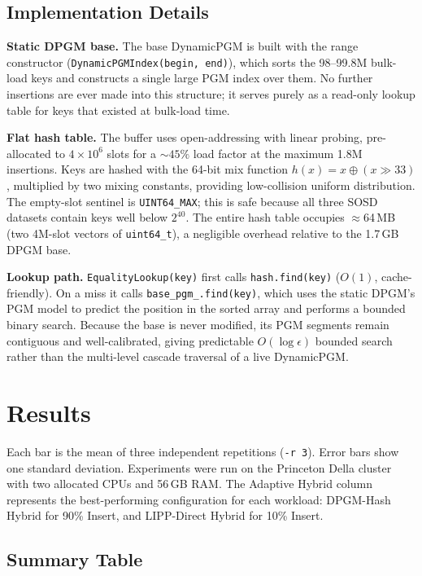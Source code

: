 \documentclass[11pt,letterpaper]{article}
\begin{document}
\subsection{Implementation Details}

\textbf{Static DPGM base.}
The base DynamicPGM is built with the range constructor
(\texttt{DynamicPGMIndex(begin, end)}), which sorts the 98--99.8M bulk-load keys
and constructs a single large PGM index over them.
No further insertions are ever made into this structure; it serves purely as a
read-only lookup table for keys that existed at bulk-load time.

\textbf{Flat hash table.}
The buffer uses open-addressing with linear probing, pre-allocated to
$4\!\times\!10^6$ slots for a $\sim\!45\%$ load factor at the maximum 1.8M
insertions.
Keys are hashed with the 64-bit mix function
$h(x) = x \oplus (x \gg 33)$, multiplied by two mixing constants, providing
low-collision uniform distribution.
The empty-slot sentinel is \texttt{UINT64\_MAX}; this is safe because all three
SOSD datasets contain keys well below $2^{40}$.
The entire hash table occupies $\approx$64\,MB (two 4M-slot vectors of
\texttt{uint64\_t}), a negligible overhead relative to the 1.7\,GB DPGM base.

\textbf{Lookup path.}
\texttt{EqualityLookup(key)} first calls \texttt{hash.find(key)} ($O(1)$,
cache-friendly).
On a miss it calls \texttt{base\_pgm\_.find(key)}, which uses the static DPGM's
PGM model to predict the position in the sorted array and performs a bounded
binary search.
Because the base is never modified, its PGM segments remain contiguous and
well-calibrated, giving predictable $O(\log\epsilon)$ bounded search rather
than the multi-level cascade traversal of a live DynamicPGM.

\section{Results}

Each bar is the mean of three independent repetitions (\texttt{-r~3}).
Error bars show one standard deviation.
Experiments were run on the Princeton Della cluster with two allocated CPUs
and 56\,GB RAM.
The Adaptive Hybrid column represents the best-performing configuration
for each workload: DPGM-Hash Hybrid for 90\% Insert, and
LIPP-Direct Hybrid for 10\% Insert.

\subsection{Summary Table}
\end{document}
